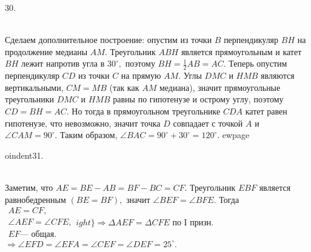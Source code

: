 30. \begin{figure}[ht!]
\end{figure}\\
Сделаем дополнительное построение: опустим из точки $B$ перпендикуляр $BH$ на продолжение медианы $AM.$ Треугольник $ABH$ является прямоугольным и катет $BH$ лежит напротив угла в $30^\circ,$ поэтому $BH=\frac{1}{2}AB=AC.$ Теперь опустим перпендикуляр $CD$ из точки $C$ на прямую $AM.$ Углы $DMC$ и $HMB$ являются вертикальными, $CM=MB$ (так как $AM$ медиана), значит прямоугольные треугольники $DMC$ и $HMB$ равны по гипотенузе и острому углу, поэтому $CD=BH=AC.$ Но тогда в прямоугольном треугольнике $CDA$ катет равен гипотенузе, что невозможно, значит точка $D$ совпадает с точкой $A$ и $\angle CAM=90^\circ.$ Таким образом, $\angle BAC=90^\circ+30^\circ=120^\circ.$
ewpage

oindent31. \begin{figure}[ht!]
\end{figure}\\
Заметим, что $AE=BE-AB=BF-BC=CF.$ Треугольник $EBF$ является равнобедренным $(BE=BF),$ значит $\angle BEF=\angle BFE.$ Тогда
$\left.\begin{array}{l}AE=CF,\\
\angle AEF=\angle CFE,\\
EF\text{--- общая.}  \end{array}
ight\}\Rightarrow \Delta AEF=\Delta CFE\text{ по I призн.}$\\$\Rightarrow \angle EFD=\angle EFA=\angle CEF=\angle DEF=25^\circ.$\\

